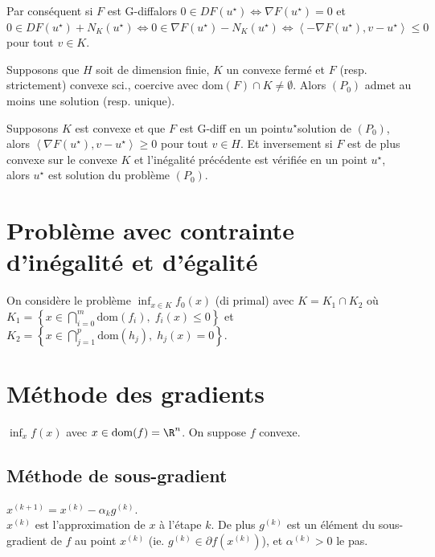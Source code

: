 \documentclass[12pt,a4paper]{article}
\begin{document}
	Par conséquent si $F$ est G-diffalors $0 \in DF(u^\star) \iff \nabla F(u^\star) = 0$ et $0 \in DF(u^\star) + N_K(u^\star) \iff 0 \in \nabla F(u^\star)-N_K(u^\star) \iff \left< -\nabla F(u^\star),v-u^\star\right> \leq 0$ pour tout $v \in K$.
	
	\begin{thm}
		\begin{minipage}[t]{15.5cm}
			Supposons que $H$ soit de dimension finie, $K$ un convexe fermé et $F$ (resp. strictement) convexe sci., coercive avec $\mathrm{dom}(F)\cap K \not = \emptyset$. Alors $(P_0)$ admet au moins une solution (resp. unique).
		\end{minipage}
	\end{thm}
	
	\begin{thm}
		\begin{minipage}[t]{15.5cm}
			Supposons $K$ est convexe et que $F$ est G-diff en un point$u^\star$solution de $(P_0)$, alors $\left<\nabla F(u^\star),v-u^\star\right> \geq 0$ pour tout $v \in H$. Et inversement si $F$ est de plus convexe sur le convexe $K$ et l'inégalité précédente est vérifiée en un point $u^\star$, alors $u^\star$ est solution du problème $(P_0)$.
		\end{minipage}
	\end{thm}
	
	\section{Problème avec contrainte d'inégalité et d'égalité}
	
	On considère le problème $\inf_{x\in K} f_0(x)$ (di primal) avec $K = K_1\cap K_2$ où $K_1 = \left\{x \in \bigcap_{i=0}^m \mathrm{dom}(f_i),\;f_i(x) \leq 0\right\}$ et $K_2 = \left\{x\in \bigcap_{j=1}^{p}\mathrm{dom}(h_j),\; h_j(x) = 0\right\}$.
	
	\section{Méthode des gradients}
	
	$\inf_x f(x)$ avec $x \in \mathrm{dom}(f) = \R^n$. On suppose $f$ convexe.
	
	\subsection{Méthode de sous-gradient}
	
	$x^{(k+1)}=x^{(k)} - \alpha_kg^{(k)}$.\\
	$x^{(k)}$ est l'approximation de $x$ à l'étape $k$. De plus $g^{(k)}$ est un élément du sous-gradient de $f$ au point $x^{(k)}$ (ie. $g^{(k)} \in \partial f(x^{(k)})$), et $\alpha^{(k)}>0$ le pas.
	
\end{document}
